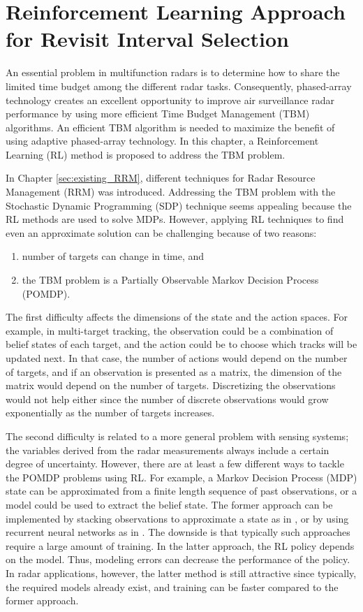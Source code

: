 \documentclass[english, 12pt, a4paper, elec, utf8, a-1b, online]{aaltothesis}
\begin{document}
\section{Reinforcement Learning Approach for Revisit Interval Selection}\label{sec:rl_ri}

An essential problem in multifunction radars is to determine how to share the limited time budget among the different radar tasks. 
Consequently, phased-array technology creates an excellent opportunity to improve air surveillance radar performance by using more efficient Time Budget Management (TBM) algorithms. 
An efficient TBM algorithm is needed to maximize the benefit of using adaptive phased-array technology. 
In this chapter, a Reinforcement Learning (RL) method is proposed to address the TBM problem.

In Chapter \ref{sec:existing_RRM}, different techniques for Radar Resource Management (RRM) was introduced.
Addressing the TBM problem with the Stochastic Dynamic Programming (SDP) technique seems appealing because the RL methods are used to solve MDPs.
However, applying RL techniques to find even an approximate solution can be challenging because of two reasons:
\begin{enumerate}
    \item number of targets can change in time, and
    \item the TBM problem is a Partially Observable Markov Decision Process (POMDP).
\end{enumerate}
The first difficulty affects the dimensions of the state and the action spaces. 
For example, in multi-target tracking, the observation could be a combination of belief states of each target, and the action could be to choose which tracks will be updated next.
In that case, the number of actions would depend on the number of targets, and if an observation is presented as a matrix, the dimension of the matrix would depend on the number of targets.
Discretizing the observations would not help either since the number of discrete observations would grow exponentially as the number of targets increases.

The second difficulty is related to a more general problem with sensing systems; the variables derived from the radar measurements always include a certain degree of uncertainty.
However, there are at least a few different ways to tackle the POMDP problems using RL.
For example, a Markov Decision Process (MDP) state can be approximated from a finite length sequence of past observations, or a model could be used to extract the belief state.
The former approach can be implemented by stacking observations to approximate a state as in \cite{Mnih2013}, or by using recurrent neural networks as in \cite{Hausknecht2015}.
The downside is that typically such approaches require a large amount of training.
In the latter approach, the RL policy depends on the model.
Thus, modeling errors can decrease the performance of the policy.
In radar applications, however, the latter method is still attractive since typically, the required models already exist, and training can be faster compared to the former approach.
\end{document}

